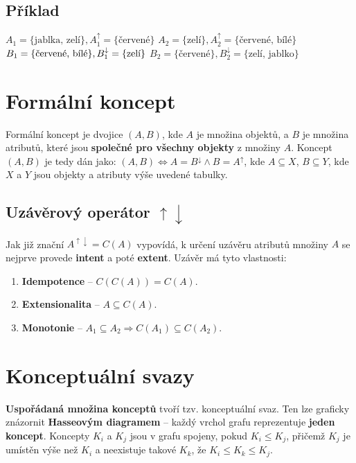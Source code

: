 \subsection*{Příklad}
$A_1 = \{\textrm{jablka, zelí}\}, A_1^\uparrow = \{\textrm{červené}\}$ \quad $A_2 = \{\textrm{zelí}\}, A_2^\uparrow = \{\textrm{červené, bílé}\}$\\
$B_1 = \{\textrm{\rm červené, bílé}\}, B_1^\downarrow = \{\textrm{zelí}\}$ \quad $B_2 = \{\textrm{červené}\}, B_2^\downarrow = \{\textrm{zelí, jablko}\}$

\section{Formální koncept}
Formální koncept je dvojice $(A, B)$, kde $A$ je množina objektů, a $B$ je množina atributů, které jsou \textbf{společné pro všechny objekty} z množiny $A$. Koncept $(A, B)$ je tedy dán jako: $(A, B) \Leftrightarrow A = B^\downarrow \land B = A^\uparrow$, kde $A \subseteq X$, $B \subseteq Y$, kde $X$ a $Y$ jsou objekty a atributy výše uvedené tabulky.

\subsection{Uzávěrový operátor $\uparrow \downarrow$}
Jak již znační $A^{\uparrow \downarrow} = C(A)$ vypovídá, k určení uzávěru atributů množiny $A$ se nejprve provede \textbf{intent} a poté \textbf{extent}. Uzávěr má tyto vlastnosti:
\begin{enumerate}
    \item \textbf{Idempotence} -- $C(C(A)) = C(A)$.
    \item \textbf{Extensionalita} -- $A \subseteq C(A)$.
    \item \textbf{Monotonie} -- $A_1 \subseteq A_2 \Rightarrow C(A_1) \subseteq C(A_2)$.
\end{enumerate}

\section{Konceptuální svazy}
\textbf{Uspořádaná množina konceptů} tvoří tzv. konceptuální svaz. Ten lze graficky znázornit \textbf{Hasseovým diagramem} -- každý vrchol grafu reprezentuje \textbf{jeden koncept}. Koncepty $ K_i $ a $ K_j $ jsou v grafu spojeny, pokud $ K_i \leq K_j$, přičemž $K_j$ je umístěn výše než $K_i$ a neexistuje takové $K_k$, že $ K_i \leq K_k \leq K_j$.

